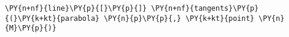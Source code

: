 \begin{Verbatim}[commandchars=\\\{\}]
    \PY{n+nf}{line}\PY{p}{[}\PY{p}{]} \PY{n+nf}{tangents}\PY{p}{(}\PY{k+kt}{parabola} \PY{n}{p}\PY{p}{,} \PY{k+kt}{point} \PY{n}{M}\PY{p}{)}
\end{Verbatim}
